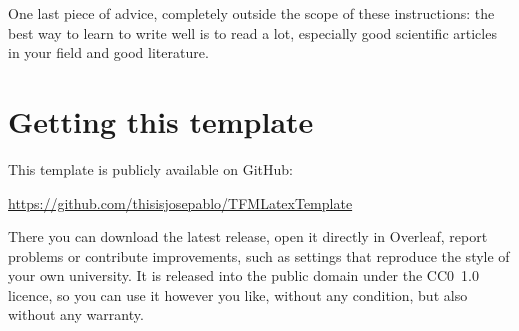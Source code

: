 One last piece of advice, completely outside the scope of these instructions: the best way
to learn to write well is to read a lot, especially good scientific articles in your field
and good literature.

\section{Getting this template}\label{sec:getting-template}

This template is publicly available on GitHub:
\begin{center}
  \url{https://github.com/thisisjosepablo/TFMLatexTemplate}
\end{center}
There you can download the latest release, open it directly in Overleaf, report problems or contribute improvements, such as
settings that reproduce the style of your own university. It is released into the public
domain under the CC0~1.0 licence, so you can use it however you like, without any condition,
but also without any warranty.
